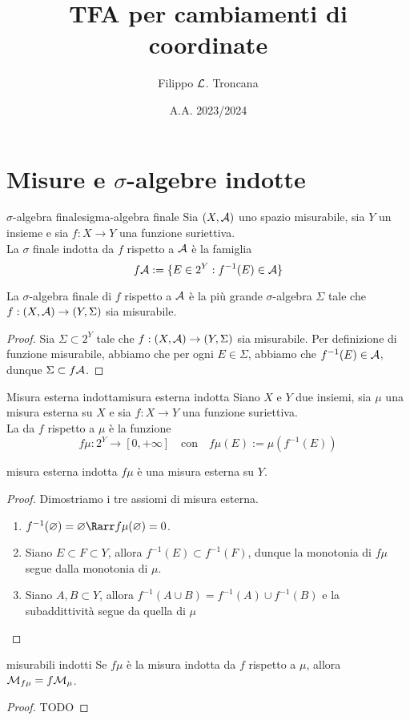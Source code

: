 \documentclass{article}
\title{TFA per cambiamenti di coordinate}
\author{Filippo $\mathcal{L}$. Troncana}
\date{A.A. 2023/2024}
\begin{document}
\maketitle

\section{Misure e $\sigma$-algebre indotte}

\begin{definition}{$\sigma$-algebra finale}{sigma-algebra finale}
    Sia $(X,\mathcal{A})$ uno spazio misurabile, sia $Y$ un insieme e sia $f:X\to Y$ una funzione suriettiva.\\
    La $\sigma$ finale indotta da $f$ rispetto a $\mathcal{A}$ è la famiglia
    \[f\mathcal{A} := \{E \in 2^Y : f^{-1}(E) \in \mathcal{A}\}\]
\end{definition}
\begin{remark}{}{}
    La $\sigma$-algebra finale di $f$ rispetto a $\mathcal{A}$ è la più grande $\sigma$-algebra $\Sigma$ tale che $f : (X,\mathcal{A})\to (Y,\Sigma)$ sia misurabile.
    \begin{proof}
        Sia $\Sigma \subset 2^Y$ tale che $f : (X,\mathcal{A})\to (Y,\Sigma)$ sia misurabile. Per definizione di funzione misurabile, abbiamo che per ogni $E \in \Sigma$, abbiamo che $f^{-1}(E)\in \mathcal{A}$, dunque $\Sigma\subset f\mathcal{A}$.
    \end{proof}
\end{remark}

\begin{definition}{Misura esterna indotta}{misura esterna indotta}
    Siano $X$ e $Y$ due insiemi, sia $\mu$ una misura esterna su $X$ e sia $f:X\to Y$ una funzione suriettiva.\\
    La  da $f$ rispetto a $\mu$ è la funzione
    \[f\mu : 2^Y \to [0,+\infty] \quad \text{con} \quad f\mu(E):= \mu(f^{-1}(E)) \]
\end{definition}
\begin{proposition}{}{misura esterna indotta}
    $f\mu$ è una misura esterna su $Y$.
    \begin{proof}
        Dimostriamo i tre assiomi di misura esterna.\begin{enumerate}
            \item $f^{-1}(\varnothing) = \varnothing \Rarr f\mu(\varnothing) = 0$.
            \item Siano $E \subset F \subset Y$, allora $f^{-1}(E)\subset f^{-1}(F)$, dunque la monotonia di $f\mu$ segue dalla monotonia di $\mu$.
            \item Siano $A,B \subset Y$, allora $f^{-1}(A\cup B)= f^{-1}(A) \cup f^{-1}(B) $ e la subaddittività segue da quella di $\mu$
        \end{enumerate}
    \end{proof}
\end{proposition}
\begin{proposition}{}{misurabili indotti}
    Se $f\mu$ è la misura indotta da $f$ rispetto a $\mu$, allora $\mathcal{M}_{f\mu} = f \mathcal{M}_\mu$.
    \begin{proof}
        TODO
    \end{proof}
\end{proposition}
\end{document}
